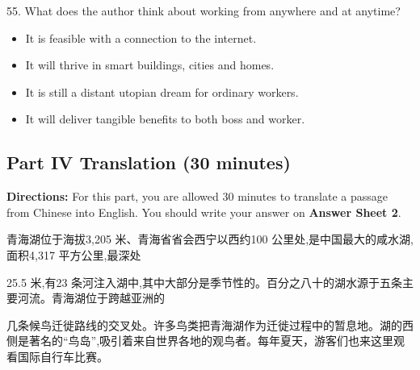 \documentclass[UTF8,11pt]{ctexart}
\begin{document}
55. What does the author think about working from anywhere and at anytime?


\begin{itemize}[leftmargin=2em,itemsep=.2em,topsep=.4em]\item[A.] It is feasible with a connection to the internet.
\item[B.] It will thrive in smart buildings, cities and homes.
\item[C.] It is still a distant utopian dream for ordinary workers.
\item[D.] It will deliver tangible benefits to both boss and worker.
\end{itemize}

\subsection*{\textbf{Part IV} \textbf{Translation} \textbf{(30 minutes)}}


\textbf{Directions:} For this part, you are allowed 30 minutes to translate a passage from Chinese into English. You should write your answer on\textbf{ Answer Sheet 2}.


青海湖位于海拔3,205 米、青海省省会西宁以西约100 公里处,是中国最大的咸水湖,面积4,317 平方公里,最深处


25.5 米,有23 条河注入湖中,其中大部分是季节性的。百分之八十的湖水源于五条主要河流。青海湖位于跨越亚洲的


几条候鸟迁徙路线的交叉处。许多鸟类把青海湖作为迁徙过程中的暂息地。湖的西侧是著名的“鸟岛”,吸引着来自世界各地的观鸟者。每年夏天，游客们也来这里观看国际自行车比赛。
\end{document}
